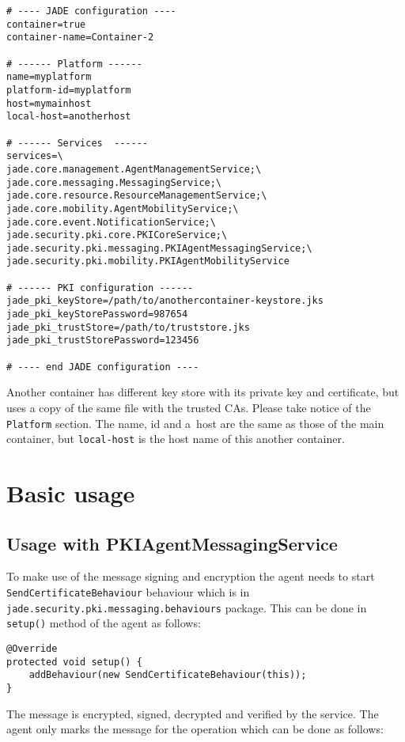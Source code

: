 \documentclass[a4paper,11pt]{article}
\begin{document}
\begin{verbatim}
# ---- JADE configuration ----
container=true
container-name=Container-2

# ------ Platform ------
name=myplatform
platform-id=myplatform
host=mymainhost
local-host=anotherhost

# ------ Services  ------
services=\
jade.core.management.AgentManagementService;\
jade.core.messaging.MessagingService;\
jade.core.resource.ResourceManagementService;\
jade.core.mobility.AgentMobilityService;\
jade.core.event.NotificationService;\
jade.security.pki.core.PKICoreService;\
jade.security.pki.messaging.PKIAgentMessagingService;\
jade.security.pki.mobility.PKIAgentMobilityService

# ------ PKI configuration ------
jade_pki_keyStore=/path/to/anothercontainer-keystore.jks
jade_pki_keyStorePassword=987654
jade_pki_trustStore=/path/to/truststore.jks
jade_pki_trustStorePassword=123456 

# ---- end JADE configuration ----
\end{verbatim}

Another container has different key store with its private key and certificate,
but uses a copy of the same file with the trusted CAs.  Please take notice of
the \texttt{Platform} section.  The name, id and a~host are the same as those
of the main container, but \texttt{local-host} is the host name of this another
container.

\section{Basic usage}

\subsection{Usage with PKI\-Agent\-Messaging\-Ser\-vice}

To make use of the message signing and encryption the agent needs to start
\texttt{Send\-Cer\-ti\-fi\-cate\-Be\-ha\-viour} behaviour which is in
\texttt{jade.\-se\-cu\-ri\-ty.\-pki.\-messaging.\-be\-ha\-viours} package.
This can be done in \texttt{setup()} method of the agent as follows:

\begin{verbatim}
@Override
protected void setup() {
    addBehaviour(new SendCertificateBehaviour(this));
}
\end{verbatim}

The message is encrypted, signed, decrypted and verified by the service.  The
agent only marks the message for the operation which can be done as follows:
\end{document}
